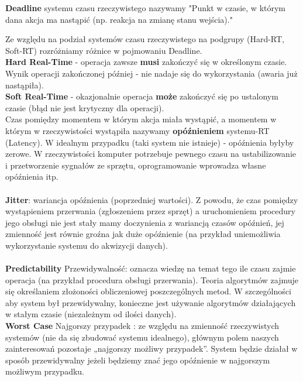 \textbf{Deadline} systemu czasu rzeczywistego nazywamy "Punkt w czasie, w którym dana akcja ma nastąpić (np. reakcja na zmianę stanu wejścia)."

Ze względu na podział systemów czasu rzeczywistego na podgrupy (Hard-RT, Soft-RT) rozróżniamy różnice w pojmowaniu Deadline. \\

\textbf{Hard Real-Time} - operacja zawsze \textbf{musi} zakończyć się w
określonym czasie. Wynik operacji zakończonej później - nie nadaje
się do wykorzystania (awaria już nastąpiła). \\

\textbf{Soft Real-Time} - okazjonalnie operacja \textbf{może} zakończyć się po
ustalonym czasie (błąd nie jest krytyczny dla operacji). \\

Czas pomiędzy momentem w którym akcja miała wystąpić, a momentem w którym w rzeczywistości wystąpiła nazywamy \textbf{opóźnieniem} systemu-RT (Latency). 
W idealnym przypadku (taki system nie istnieje) - opóźnienia
byłyby zerowe. W rzeczywistości komputer potrzebuje pewnego czasu na
ustabilizowanie i przetworzenie sygnałów ze sprzętu,
oprogramowanie wprowadza własne opóźnienia itp. \\ \\
\textbf{Jitter}: wariancja opóźnienia (poprzedniej wartości). Z powodu, że czas pomiędzy wystąpieniem przerwania (zgłoszeniem przez sprzęt) a uruchomieniem procedury jego obsługi nie jest stały mamy doczynienia z wariancją czasów opóźnień, jej zmienność jest równie groźna jak duże opóźnienie (na
przykład uniemożliwia wykorzystanie systemu do akwizycji danych). \\ \\

\textbf{Predictability} Przewidywalność: oznacza wiedzę na temat tego ile czasu zajmie operacja (na
przykład procedura obsługi przerwania).
Teoria algorytmów zajmuje się określaniem złożoności
obliczeniowej poszczególnych metod. W szczególności aby system
był przewidywalny, konieczne jest używanie algorytmów
działających w stałym czasie (niezależnym od ilości danych). \\ 

\textbf{Worst Case} Najgorszy przypadek : ze względu na zmienność rzeczywistych systemów (nie da się zbudować systemu idealnego), głównym polem naszych
zainteresowań pozostaje „najgorszy możliwy przypadek”.
System będzie działał w sposób przewidywalny jeżeli będziemy
znać jego opóźnienie w najgorszym możliwym przypadku.
\clearpage

